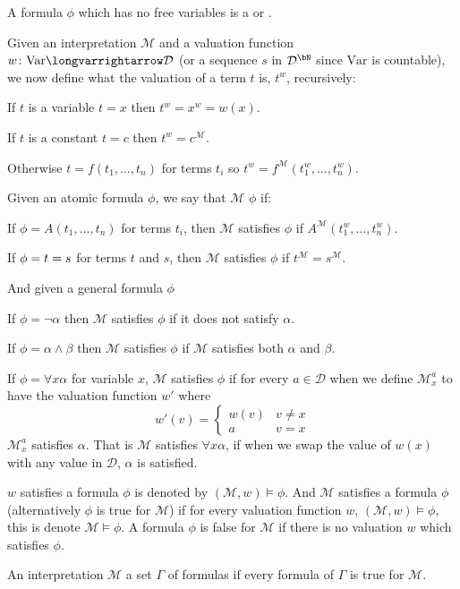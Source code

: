 \documentclass[10pt]{article}
\let\longto=\longvarrightarrow
\def\beqq{\mathrel{\vbox{\hbox{$=$}\kern-\baselineskip\kern.3pt\hbox{$=$}}}}
\def\mM{\mathcal{M}}
\def\mD{\mathcal{D}}
\def\Var{\mathrm{Var}}
\begin{document}
\begin{defn*}

    A formula $\phi$ which has no free variables is a  or .

\end{defn*}

\begin{defn*}
    
    Given an interpretation $\mM$ and a valuation function $w\colon\Var\longto\mD$ (or a sequence $s$ in $\mD^\bN$ since $\Var$ is countable), we now define what the valuation of a term $t$ is, $t^w$,
    recursively:
    \blist
        \item If $t$ is a variable $t=x$ then $t^w=x^w=w(x)$.
        \item If $t$ is a constant $t=c$ then $t^w=c^{\mM}$.
        \item Otherwise $t=f(t_1,\dots,t_n)$ for terms $t_i$ so $t^w=f^{\mM}(t_1^w,\dots,t_n^w)$.
    \elist

    Given an atomic formula $\phi$, we say that $\mM$  $\phi$ if:
    \blist
        \item If $\phi=A(t_1,\dots,t_n)$ for terms $t_i$, then $\mM$ satisfies $\phi$ if $A^\mM(t_1^w,\dots,t_n^w)$.
        \item If $\phi=t\beqq s$ for terms $t$ and $s$, then $\mM$ satisfies $\phi$ if $t^\mM=s^\mM$.
    \elist

    And given a general formula $\phi$
    \blist
        \item If $\phi=\neg\alpha$ then $\mM$ satisfies $\phi$ if it does not satisfy $\alpha$.
        \item If $\phi=\alpha\land\beta$ then $\mM$ satisfies $\phi$ if $\mM$ satisfies both $\alpha$ and $\beta$.
        \item If $\phi=\forall x\alpha$ for variable $x$, $\mM$ satisfies $\phi$ if for every $a\in\mD$ when we define $\mM^a_x$ to have the valuation function $w'$ where
        \[ w'(v) = \begin{cases} w(v) & v\neq x \\ a & v=x \end{cases} \]
        $\mM^a_x$ satisfies $\alpha$.
        That is $\mM$ satisfies $\forall x\alpha$, if when we swap the value of $w(x)$ with any value in $\mD$, $\alpha$ is satisfied.
    \elist

    $w$ satisfies a formula $\phi$ is denoted by $(\mM,w)\vDash\phi$.
    And $\mM$ satisfies a formula $\phi$ (alternatively $\phi$ is true for $\mM$) if for every valuation function $w$, $(\mM,w)\vDash\phi$, this is denote $\mM\vDash\phi$.
    A formula $\phi$ is false for $\mM$ if there is no valuation $w$ which satisfies $\phi$.

    An interpretation $\mM$  a set $\Gamma$ of formulas if every formula of $\Gamma$ is true for $\mM$.

\end{defn*}
\end{document}
